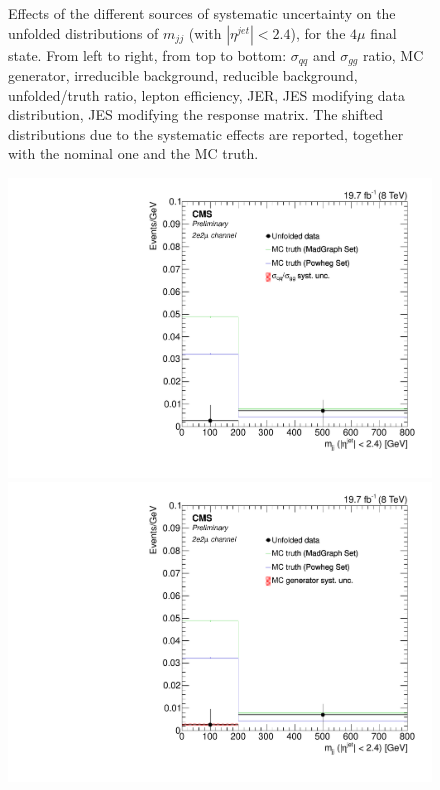 \begin{figure}[hbtp]
\begin{center}
    \caption{Effects of the different sources of systematic uncertainty on the unfolded distributions of $m_{jj}$ (with $|\eta^{jet}|<2.4$), for the $4\mu$ final state. From left to right, from top to bottom: $\sigma_{qq}$ and $\sigma_{gg}$ ratio, MC generator, irreducible background, reducible background, unfolded/truth ratio, lepton efficiency, JER, JES modifying data distribution, JES modifying the response matrix. The shifted distributions due to the systematic effects are reported, together with the nominal one and the MC truth.}
    \label{fig:CentralMjj_syst_4m}
  \end{center}
\end{figure}

\begin{figure}[hbtp]
  \begin{center}
    \includegraphics[width=0.8\cmsFigWidth]{Figures/Unfolding/Systematics/ZZTo2e2m_CentralMjj_qqgg_Mad_fr}     
    \includegraphics[width=0.8\cmsFigWidth]{Figures/Unfolding/Systematics/ZZTo2e2m_CentralMjj_MCgen_Mad_fr}     

\end{center}
\end{figure}
